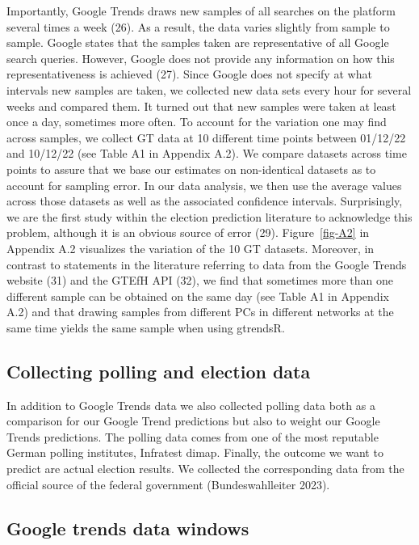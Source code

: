 \documentclass[
  letterpaper,
  DIV=11,
  numbers=noendperiod]{scrartcl}
\begin{document}
Importantly, Google Trends draws new samples of all searches on the
platform several times a week (26). As a result, the data varies
slightly from sample to sample. Google states that the samples taken are
representative of all Google search queries. However, Google does not
provide any information on how this representativeness is achieved (27).
Since Google does not specify at what intervals new samples are taken,
we collected new data sets every hour for several weeks and compared
them. It turned out that new samples were taken at least once a day,
sometimes more often. To account for the variation one may find across
samples, we collect GT data at 10 different time points between 01/12/22
and 10/12/22 (see Table A1 in Appendix A.2). We compare datasets across
time points to assure that we base our estimates on non-identical
datasets as to account for sampling error. In our data analysis, we then
use the average values across those datasets as well as the associated
confidence intervals. Surprisingly, we are the first study within the
election prediction literature to acknowledge this problem, although it
is an obvious source of error (29). Figure~\ref{fig-A2} in Appendix A.2
visualizes the variation of the 10 GT datasets. Moreover, in contrast to
statements in the literature referring to data from the Google Trends
website (31) and the GTEfH API (32), we find that sometimes more than
one different sample can be obtained on the same day (see Table A1 in
Appendix A.2) and that drawing samples from different PCs in different
networks at the same time yields the same sample when using gtrendsR.

\hypertarget{collecting-polling-and-election-data}{%
\subsection{Collecting polling and election
data}\label{collecting-polling-and-election-data}}

In addition to Google Trends data we also collected polling data both as
a comparison for our Google Trend predictions but also to weight our
Google Trends predictions. The polling data comes from one of the most
reputable German polling institutes, Infratest dimap. Finally, the
outcome we want to predict are actual election results. We collected the
corresponding data from the oﬃcial source of the federal government
(Bundeswahlleiter 2023).

\hypertarget{google-trends-data-windows}{%
\subsection{Google trends data
windows}\label{google-trends-data-windows}}
\end{document}
